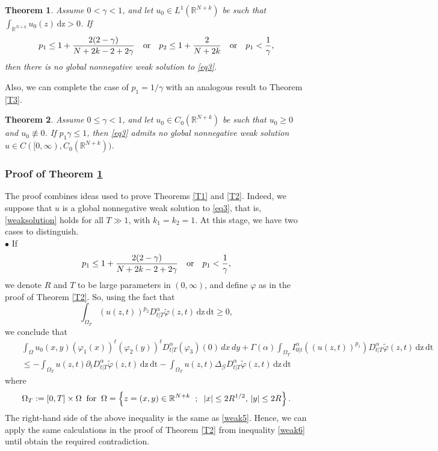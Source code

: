 \documentclass[reqno,11pt]{amsart}
\newtheorem{theorem}{Theorem}[section]
\numberwithin{equation}{section}
\def\R{{\mathbb {R}}}
\def\R{\mathbb{R}}
\begin{document}


\begin{theorem}\label{T4} Assume $0<\gamma<1$, and let $u_0\in L^1(\R^{N+k})$ be such that $\displaystyle \int_{\R^{N+k}}u_0(z)\,\mathrm{dz}>0$. If
	$$p_1\leq1+\frac{2(2-\gamma)}{N+2k-2+2\gamma}\quad\hbox{or}\quad p_2\leq1+\frac{2}{N+2k}\quad\hbox{or}\quad
	p_1<\frac{1}{\gamma},$$
	then there is no global nonnegative weak solution to \eqref{eq3}.
\end{theorem}


Also, we can complete the case of $p_1=1/\gamma$ with an analogous result to Theorem \ref{T3}.
\begin{theorem}\label{T5} Assume $0\leq \gamma<1$, and let $u_0\in C_0(\R^{N+k})$ be such that $u_0\geq0$ and $u_0\not\equiv0$. If $p_1\gamma\leq 1$,  then
	\eqref{eq3} admits no global nonnegative weak solution $u\in C([0,\infty),C_0(\R^{N+k}))$.
\end{theorem}


\subsubsection{Proof of Theorem \ref{T4}}
The proof combines ideas used to prove Theorems \ref{T1} and \ref{T2}. Indeed, we suppose that $u$ is a global nonnegative weak solution to \eqref{eq3}, that is,  \eqref{weaksolution} holds for all $T\gg1$, with $k_1=k_2=1$. At this stage, we have two cases to distinguish.\\

\noindent $\bullet$ If 
$$p_1\leq1+\frac{2(2-\gamma)}{N+2k-2+2\gamma}\quad\hbox{or}\quad p_1<\frac{1}{\gamma} ,$$
we denote $R$ and $T$ to be large parameters in $(0,\infty)$, and define $\varphi$ as in the proof of Theorem \ref{T2}. So, using the fact that 
$$\displaystyle \int_{\Omega_T}(u(z,t))^{p_2}D^{\alpha}_{t|T}\widetilde{\varphi}(z,t)\,\mathrm{dz}\,\mathrm{dt}\geq0,$$ 
we conclude that
\begin{eqnarray*}
	&&\int_{\Omega}u_0(x,y)\left(\varphi_1(x)\right)^\ell \left(\varphi_2(y)\right)^\ell D^\alpha_{t|T}(\varphi_3)(0)\,dx\,dy+\Gamma(\alpha)\int_{\Omega_T}I^\alpha_{0|t}((u(z,t))^{p_1})D^{\alpha}_{t|T}\widetilde{\varphi}(z,t)\,\mathrm{dz}\,\mathrm{dt}\nonumber\\
	&&\leq -\int_{\Omega_T}u(z,t)\partial_tD^{\alpha}_{t|T}\widetilde{\varphi}(z,t)\,\mathrm{dz}\,\mathrm{dt} -\int_{\Omega_T}u(z,t)\Delta_{\mathcal{G}}D^{\alpha}_{t|T}\widetilde{\varphi}(z,t)\,\mathrm{dz}\,\mathrm{dt}
\end{eqnarray*}
where
\[
\Omega_T:=[0,T]\times\Omega\;\;\text{for}\;\; \Omega=\left\{ z=(x,y)\in{\mathbb{R}}^{N+k}\hspace{2
	mm};\hspace{2mm}|x|\leq 2 R^{1/2},\,|y|\leq 2 R\right\}.
\]
The right-hand side of the above inequality is the same as \eqref{weak5}. Hence, we can apply the same calculations in the proof of Theorem \ref{T2} from inequality \eqref{weak6} until obtain the required contradiction.\\
\end{document}
